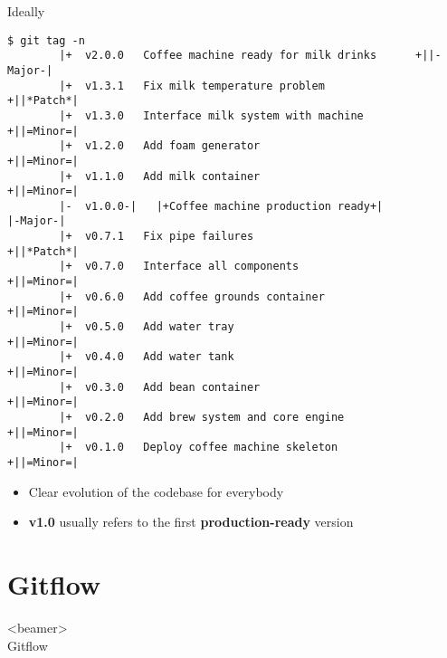 \documentclass[usenames,svgnames,14pt]{beamer}
\begin{document}
\begin{frame}[fragile]{Ideally}
    \vspace{-2mm}
    \begin{lstlisting}[style=MyBash]
        $ git tag -n
        |+  v2.0.0   Coffee machine ready for milk drinks      +||-Major-|
        |+  v1.3.1   Fix milk temperature problem              +||*Patch*|
        |+  v1.3.0   Interface milk system with machine        +||=Minor=|
        |+  v1.2.0   Add foam generator                        +||=Minor=|
        |+  v1.1.0   Add milk container                        +||=Minor=|
        |-  v1.0.0-|   |+Coffee machine production ready+|           |-Major-|
        |+  v0.7.1   Fix pipe failures                         +||*Patch*|
        |+  v0.7.0   Interface all components                  +||=Minor=|
        |+  v0.6.0   Add coffee grounds container              +||=Minor=|
        |+  v0.5.0   Add water tray                            +||=Minor=|
        |+  v0.4.0   Add water tank                            +||=Minor=|
        |+  v0.3.0   Add bean container                        +||=Minor=|
        |+  v0.2.0   Add brew system and core engine           +||=Minor=|
        |+  v0.1.0   Deploy coffee machine skeleton            +||=Minor=|
    \end{lstlisting}
    \begin{itemize}
        \item Clear evolution of the codebase for everybody
        \item \textbf{v1.0} usually refers to the first \textbf{production-ready} version
    \end{itemize}
\end{frame}




\section{Gitflow}
\begin{frame}<beamer>{\\ \colorbox{PP}{}\;Gitflow}
    \vspace{3mm}
    \tableofcontents[sections={5}, currentsection, currentsubsection, hideothersubsections, sectionstyle=hide]
\end{frame}
\end{document}
